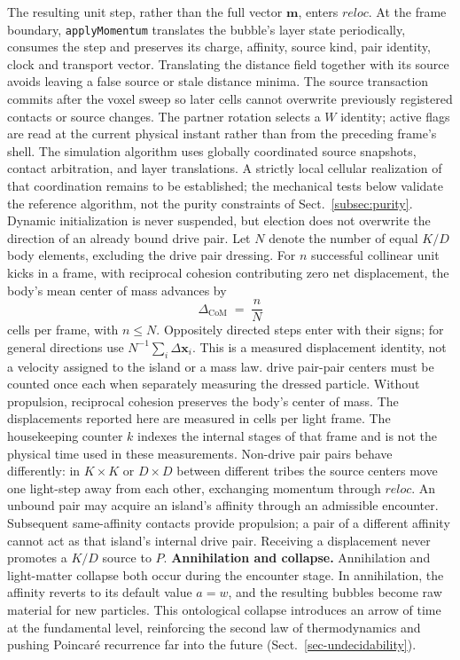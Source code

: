 \documentclass{ijuc}
\begin{document}
The resulting unit step, rather than the full vector $\boldsymbol{m}$, enters $\boldsymbol{\mathit{reloc}}$. At the frame boundary, \texttt{applyMomentum} translates the bubble's layer state periodically, consumes the step and preserves its charge, affinity, source kind, pair identity, clock and transport vector. Translating the distance field together with its source avoids leaving a false source or stale distance minima. The source transaction commits after the voxel sweep so later cells cannot overwrite previously registered contacts or source changes. The partner rotation selects a $W$ identity; active flags are read at the current physical instant rather than from the preceding frame's shell.
The simulation algorithm uses globally coordinated source snapshots, contact arbitration, and layer translations. A strictly local cellular realization of that coordination remains to be established; the mechanical tests below validate the reference algorithm, not the purity constraints of Sect.~\ref{subsec:purity}. Dynamic initialization is never suspended, but election does not overwrite the direction of an already bound drive pair.
Let $N$ denote the number of equal $K/D$ body elements, excluding the drive pair dressing. For $n$ successful collinear unit kicks in a frame, with reciprocal cohesion contributing zero net displacement, the body's mean center of mass advances by
\begin{equation}
\Delta_{\mathrm{CoM}} \;=\; \frac{n}{N}
\end{equation}
cells per frame, with $n \leq N$. Oppositely directed steps enter with their signs; for general directions use $N^{-1}\sum_i\Delta\boldsymbol{x}_i$. This is a measured displacement identity, not a velocity assigned to the island or a mass law. drive pair-pair centers must be counted once each when separately measuring the dressed particle. Without propulsion, reciprocal cohesion preserves the body's center of mass. The displacements reported here are measured in cells per light frame. The housekeeping counter $k$ indexes the internal stages of that frame and is not the physical time used in these measurements.
Non-drive pair pairs behave differently: in $K \times K$ or $D \times D$ between different tribes the source centers move one light-step away from each other, exchanging momentum through $\boldsymbol{\mathit{reloc}}$.
An unbound pair may acquire an island's affinity through an admissible encounter. Subsequent same-affinity contacts provide propulsion; a pair of a different affinity cannot act as that island's internal drive pair. Receiving a displacement never promotes a $K/D$ source to $P$.
\medskip\noindent\textbf{Annihilation and collapse.} Annihilation and light-matter collapse both occur during the encounter stage. In annihilation, the affinity reverts to its default value $a=w$, and the resulting bubbles become raw material for new particles.
This ontological collapse introduces an arrow of time at the fundamental level, reinforcing the second law of thermodynamics and pushing Poincar\'{e} recurrence far into the future (Sect.~\ref{sec-undecidability}).
\end{document}
